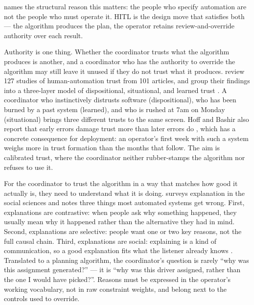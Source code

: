 \textcite{bainbridge1983ironies} names the structural reason this matters: the people who specify automation are not the people who must operate it. HITL is the design move that satisfies both --- the algorithm produces the plan, the operator retains review-and-override authority over each result.

Authority is one thing. Whether the coordinator trusts what the algorithm produces is another, and a coordinator who has the authority to override the algorithm may still leave it unused if they do not trust what it produces. \textcite{hoff2015trust} review 127 studies of human-automation trust from 101 articles, and group their findings into a three-layer model of dispositional, situational, and learned trust \parencite[p.~413]{hoff2015trust}. A coordinator who instinctively distrusts software (dispositional), who has been burned by a past system (learned), and who is rushed at 7am on Monday (situational) brings three different trusts to the same screen. Hoff and Bashir also report that early errors damage trust more than later errors do \parencite[p.~426]{hoff2015trust}, which has a concrete consequence for deployment: an operator's first week with such a system weighs more in trust formation than the months that follow. The aim is calibrated trust, where the coordinator neither rubber-stamps the algorithm nor refuses to use it.

For the coordinator to trust the algorithm in a way that matches how good it actually is, they need to understand what it is doing. \textcite{miller2019explanation} surveys explanation in the social sciences and notes three things most automated systems get wrong. First, explanations are contrastive: when people ask why something happened, they usually mean why it happened rather than the alternative they had in mind. Second, explanations are selective: people want one or two key reasons, not the full causal chain. Third, explanations are social: explaining is a kind of communication, so a good explanation fits what the listener already knows \parencite[p.~3]{miller2019explanation}. Translated to a planning algorithm, the coordinator's question is rarely ``why was this assignment generated?'' --- it is ``why was this driver assigned, rather than the one I would have picked?''. Reasons must be expressed in the operator's working vocabulary, not in raw constraint weights, and belong next to the controls used to override.

